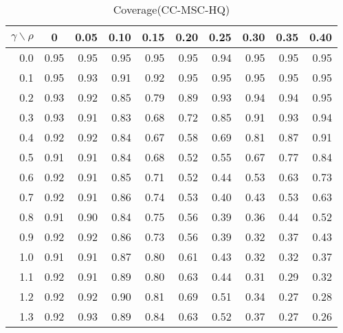 \documentclass[12pt]{article}
\begin{document}
%
\begin{table}[!tbp]
\caption{Coverage(CC-MSC-HQ)}
 \begin{center}
 \begin{tabular}{r|rrrrrrrrr}\hline\hline
\multicolumn{1}{c|}{$\gamma\backslash\rho$}&\multicolumn{1}{c}{0}&\multicolumn{1}{c}{0.05}&\multicolumn{1}{c}{0.10}&\multicolumn{1}{c}{0.15}&\multicolumn{1}{c}{0.20}&\multicolumn{1}{c}{0.25}&\multicolumn{1}{c}{0.30}&\multicolumn{1}{c}{0.35}&\multicolumn{1}{c}{0.40}\tabularnewline
\hline

0.0&0.95&0.95&0.95&0.95&0.95&0.94&0.95&0.95&0.95\tabularnewline
0.1&0.95&0.93&0.91&0.92&0.95&0.95&0.95&0.95&0.95\tabularnewline
0.2&0.93&0.92&0.85&0.79&0.89&0.93&0.94&0.94&0.95\tabularnewline
0.3&0.93&0.91&0.83&0.68&0.72&0.85&0.91&0.93&0.94\tabularnewline
0.4&0.92&0.92&0.84&0.67&0.58&0.69&0.81&0.87&0.91\tabularnewline
0.5&0.91&0.91&0.84&0.68&0.52&0.55&0.67&0.77&0.84\tabularnewline
0.6&0.92&0.91&0.85&0.71&0.52&0.44&0.53&0.63&0.73\tabularnewline
0.7&0.92&0.91&0.86&0.74&0.53&0.40&0.43&0.53&0.63\tabularnewline
0.8&0.91&0.90&0.84&0.75&0.56&0.39&0.36&0.44&0.52\tabularnewline
0.9&0.92&0.92&0.86&0.73&0.56&0.39&0.32&0.37&0.43\tabularnewline
1.0&0.91&0.91&0.87&0.80&0.61&0.43&0.32&0.32&0.37\tabularnewline
1.1&0.92&0.91&0.89&0.80&0.63&0.44&0.31&0.29&0.32\tabularnewline
1.2&0.92&0.92&0.90&0.81&0.69&0.51&0.34&0.27&0.28\tabularnewline
1.3&0.92&0.93&0.89&0.84&0.63&0.52&0.37&0.27&0.26\tabularnewline
\hline
\end{tabular}

\end{center}

\end{table}
\end{document}
